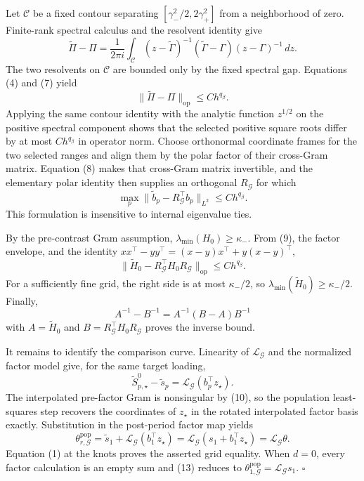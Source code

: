 Let \(\mathscr C\) be a fixed contour separating \([\gamma_-^2/2,2\gamma_+^2]\) from a neighborhood of zero. Finite-rank spectral calculus and the resolvent identity give
\[
 \widetilde\Pi-\Pi
 =\frac{1}{2\pi i}\int_{\mathscr C}
 (z-\widetilde\Gamma)^{-1}(\widetilde\Gamma-\Gamma)(z-\Gamma)^{-1}\,dz. \tag{7}
\]
The two resolvents on \(\mathscr C\) are bounded only by the fixed spectral gap. Equations (4) and (7) yield
\[
 \|\widetilde\Pi-\Pi\|_{\mathrm{op}}\le C h^{q_\beta}. \tag{8}
\]
Applying the same contour identity with the analytic function \(z^{1/2}\) on the positive spectral component shows that the selected positive square roots differ by at most \(Ch^{q_\beta}\) in operator norm. Choose orthonormal coordinate frames for the two selected ranges and align them by the polar factor of their cross-Gram matrix. Equation (8) makes that cross-Gram matrix invertible, and the elementary polar identity then supplies an orthogonal \(R_{\mathcal G}\) for which
\[
 \max_p\|\widetilde b_p-R_{\mathcal G}^{\top}b_p\|_{L^2}
 \le C h^{q_\beta}. \tag{9}
\]
This formulation is insensitive to internal eigenvalue ties.

By the pre-contrast Gram assumption, \(\lambda_{\min}(H_0)\ge\kappa_-\). From (9), the factor envelope, and the identity \(xx^\top-yy^\top=(x-y)x^\top+y(x-y)^\top\),
\[
 \|\widetilde H_0-R_{\mathcal G}^{\top}H_0R_{\mathcal G}\|_{\mathrm{op}}
 \le C h^{q_\beta}. \tag{10}
\]
For a sufficiently fine grid, the right side is at most \(\kappa_-/2\), so \(\lambda_{\min}(\widetilde H_0)\ge\kappa_-/2\). Finally,
\[
 A^{-1}-B^{-1}=A^{-1}(B-A)B^{-1} \tag{11}
\]
with \(A=\widetilde H_0\) and \(B=R_{\mathcal G}^{\top}H_0R_{\mathcal G}\) proves the inverse bound.

It remains to identify the comparison curve. Linearity of \(\mathcal L_{\mathcal G}\) and the normalized factor model give, for the same target loading,
\[
 \widetilde S^0_{p,\star}-\widetilde s_p
 =\mathcal L_{\mathcal G}(b_p^\top z_\star). \tag{12}
\]
The interpolated pre-factor Gram is nonsingular by (10), so the population least-squares step recovers the coordinates of \(z_\star\) in the rotated interpolated factor basis exactly. Substitution in the post-period factor map yields
\[
 \theta^{\mathrm{pop}}_{r,\mathcal G}
 =\widetilde s_1+\mathcal L_{\mathcal G}(b_1^\top z_\star)
 =\mathcal L_{\mathcal G}(s_1+b_1^\top z_\star)
 =\mathcal L_{\mathcal G}\theta. \tag{13}
\]
Equation (1) at the knots proves the asserted grid equality. When \(d=0\), every factor calculation is an empty sum and (13) reduces to \(\theta^{\mathrm{pop}}_{1,\mathcal G}=\mathcal L_{\mathcal G}s_1\). \(\square\)